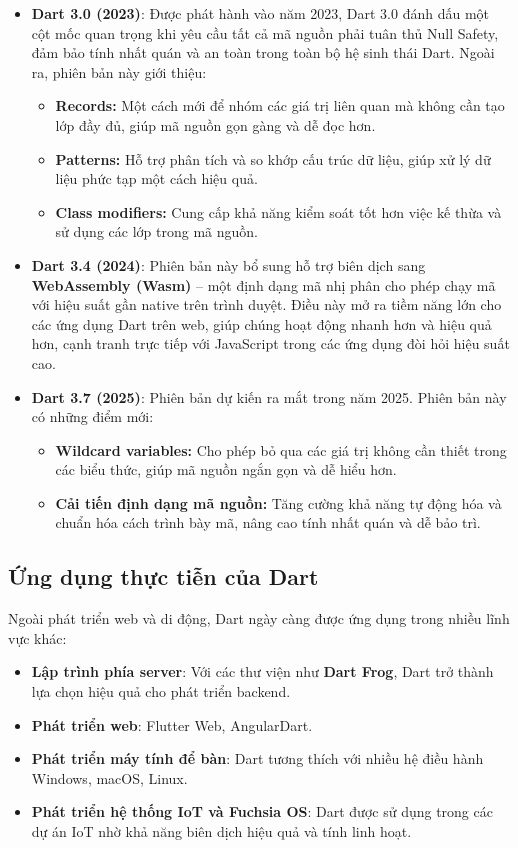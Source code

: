 \documentclass[../DoAn.tex]{subfiles}
\numberwithin{figure}{chapter}
\begin{document}
\begin{itemize}
    \item \textbf{Dart 3.0 (2023)}: Được phát hành vào năm 2023, Dart 3.0 đánh dấu một cột mốc quan trọng khi yêu cầu tất cả mã nguồn phải tuân thủ Null Safety, đảm bảo tính nhất quán và an toàn trong toàn bộ hệ sinh thái Dart. Ngoài ra, phiên bản này giới thiệu:
    \begin{itemize}
        \item \textbf{Records: } Một cách mới để nhóm các giá trị liên quan mà không cần tạo lớp đầy đủ, giúp mã nguồn gọn gàng và dễ đọc hơn.
        \item \textbf{Patterns: } Hỗ trợ phân tích và so khớp cấu trúc dữ liệu, giúp xử lý dữ liệu phức tạp một cách hiệu quả.
        \item \textbf{Class modifiers: } Cung cấp khả năng kiểm soát tốt hơn việc kế thừa và sử dụng các lớp trong mã nguồn.
    \end{itemize}
    
    \item \textbf{Dart 3.4 (2024)}: Phiên bản này bổ sung hỗ trợ biên dịch sang \textbf{WebAssembly (Wasm)} – một định dạng mã nhị phân cho phép chạy mã với hiệu suất gần native trên trình duyệt. Điều này mở ra tiềm năng lớn cho các ứng dụng Dart trên web, giúp chúng hoạt động nhanh hơn và hiệu quả hơn, cạnh tranh trực tiếp với JavaScript trong các ứng dụng đòi hỏi hiệu suất cao.
    \item \textbf{Dart 3.7 (2025)}: Phiên bản dự kiến ra mắt trong năm 2025. Phiên bản này có những điểm mới:
    \begin{itemize}
        \item \textbf{Wildcard variables:} Cho phép bỏ qua các giá trị không cần thiết trong các biểu thức, giúp mã nguồn ngắn gọn và dễ hiểu hơn.
        \item \textbf{Cải tiến định dạng mã nguồn:} Tăng cường khả năng tự động hóa và chuẩn hóa cách trình bày mã, nâng cao tính nhất quán và dễ bảo trì.
    \end{itemize}
\end{itemize}

\subsection{Ứng dụng thực tiễn của Dart}
Ngoài phát triển web và di động, Dart ngày càng được ứng dụng trong nhiều lĩnh vực khác:

\begin{itemize}
    \item \textbf{Lập trình phía server}: Với các thư viện như \textbf{Dart Frog}, Dart trở thành lựa chọn hiệu quả cho phát triển backend.
    \item \textbf{Phát triển web}: Flutter Web, AngularDart.
    \item \textbf{Phát triển máy tính để bàn}: Dart tương thích với nhiều hệ điều hành Windows, macOS, Linux.
    \item \textbf{Phát triển hệ thống IoT và Fuchsia OS}: Dart được sử dụng trong các dự án IoT nhờ khả năng biên dịch hiệu quả và tính linh hoạt.
\end{itemize}
\end{document}
